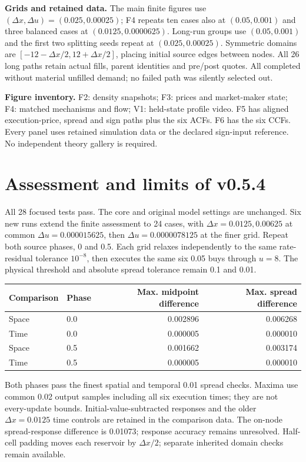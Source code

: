 \documentclass[11pt,a4paper]{article}
\newcommand{\du}{\Delta u}\newcommand{\dx}{\Delta x}
\begin{document}
\textbf{Grids and retained data.} The main finite figures use
$(\dx,\du)=(0.025,0.00025)$; F4 repeats ten cases also at $(0.05,0.001)$
and three balanced cases at $(0.0125,0.0000625)$.
Long-run groups use $(0.05,0.001)$ and the first two splitting seeds repeat
at $(0.025,0.00025)$. Symmetric domains are $[-12-\dx/2,12+\dx/2]$,
placing initial source edges between nodes. All 26 long paths retain
actual fills, parent identities and pre/post quotes. All completed without
material unfilled demand; no failed path was silently selected out.

\textbf{Figure inventory.} F2: density snapshots; F3: prices and market-maker
state; F4: matched mechanisms and flow; V1: held-state profile video.
F5 has aligned execution-price, spread and sign paths plus the six ACFs.
F6 has the six CCFs. Every panel uses retained simulation data or the
declared sign-input reference. No independent theory gallery is required.

\newpage
\section{Assessment and limits of v0.5.4}
All 28 focused tests pass. The core and original model settings are
unchanged. Six new runs extend the finite assessment to 24 cases, with
$\dx=0.0125,0.00625$ at common $\du=0.000015625$, then
$\du=0.0000078125$ at the finer grid. Repeat both source phases, 0 and
0.5. Each grid relaxes independently to the same rate-residual tolerance
$10^{-8}$, then executes the same six 0.05 buys through $u=8$.
The physical threshold and absolute spread tolerance remain 0.1 and 0.01.

\begin{center}
\begin{tabular}{llrr}
\toprule
Comparison & Phase & Max. midpoint difference & Max. spread difference\\
\midrule
Space & 0.0 & 0.002896 & 0.006268 \\
Time & 0.0 & 0.000005 & 0.000010 \\
Space & 0.5 & 0.001662 & 0.003174 \\
Time & 0.5 & 0.000005 & 0.000010 \\
\bottomrule
\end{tabular}
\end{center}
Both phases pass the finest spatial and temporal 0.01 spread checks. Maxima use common 0.02 output samples including all six
execution times; they are not every-update bounds. Initial-value-subtracted
responses and the older $\dx=0.0125$ time controls are retained in the
comparison data. The on-node spread-response difference is 0.01073;
response accuracy remains unresolved. Half-cell padding moves each reservoir by $\dx/2$;
separate inherited domain checks remain available.
\end{document}
